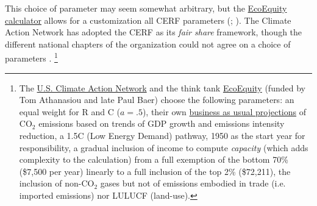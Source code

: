 This choice of parameter may seem somewhat arbitrary, but the \href{https://climateequityreference.org}{EcoEquity calculator} allows for a customization all CERF %
parameters (; ). The Climate Action Network has adopted the CERF %
as its \textit{fair share} framework, though the different national chapters of the organization could not agree on a choice of parameters .%
\footnote{The \href{https://usfairshare.org/}{U.S. Climate Action Network} and the think tank \href{https://www.ecoequity.org/about/}{EcoEquity} (funded by Tom Athanasiou and late Paul Baer) choose the following parameters: an equal weight for R and C ($a=.5$), their own \href{https://climateequityreference.org/calculator-information/gdp-and-emissions-baselines/}{business as usual projections} of CO$_\text{2}$ emissions based on trends of GDP growth and emissions intensity reduction,  %
a 1.5\textdegree{}C (Low Energy Demand) pathway, 1950 as the start year for responsibility, a gradual inclusion of income to compute \textit{capacity} (which adds complexity to the calculation) from a full exemption of the bottom 70\% (\$7,500 per year) linearly to a full inclusion of the top 2\% (\$72,211), the inclusion of non-CO$_\text{2}$ gases but not of emissions embodied in trade (i.e. imported emissions) nor LULUCF (land-use). }

